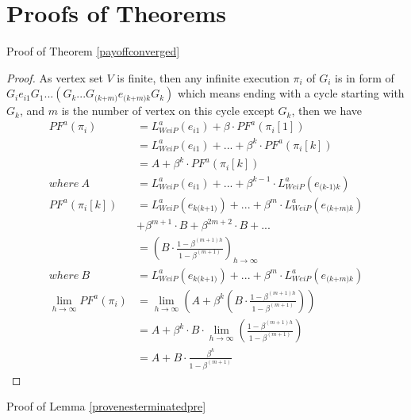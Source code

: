 \documentclass{acm_proc_article-sp}
\begin{document}



\newpage
\appendix

\section{Proofs of Theorems}
Proof of Theorem \ref{payoffconverged}
\begin{proof}
As vertex set $V$ is finite, then any infinite execution $\pi_{\textit{i}}$ of $G_{\textit{i}}$ is in form of $ G_{\textit{i}}e_{\textit{i1}}G_{\textit{1}}...(G_{\textit{k}}...G_ {\textit{(k+m)}}e_{\textit{(k+m)k}}G_{\textit{k}})$ which means ending with a cycle starting with $G_{\textit{k}}$, and $m$ is the number of vertex on this cycle except $G_{\textit{k}}$, then we have
\begin{align*}
PF^a(\pi_{\textit{i}})&=L^a_{\textit{WeiP}}(e_{\textit{i1}})+\beta\cdot PF^a(\pi_{\textit{i}}[1])\\
&=L^a_{\textit{WeiP}}(e_{\textit{i1}})+...+\beta^{k}\cdot PF^a(\pi_{\textit{i}}[k])\\
&=A+\beta^{k}\cdot PF^a(\pi_{\textit{i}}[k])\\
where~A&=L^a_{\textit{WeiP}}(e_{\textit{i1}})+...+\beta^{k-1}\cdot L^a_{\textit{WeiP}}(e_{\textit{(k-1)k}}) \\
PF^a(\pi_{\textit{i}}[k]) & =L^a_{\textit{WeiP}}(e_{\textit{k(k+1)}})+...+\beta^{m}\cdot L^a_{\textit{WeiP}}(e_{\textit{(k+m)k}})\\
&+\beta^{m+1}\cdot B+\beta^{2m+2}\cdot B+...\\
& =(B\cdot \frac{1-\beta^{(m+1)h}}{1-\beta^{(m+1)}})_{h\rightarrow \infty}\\
where~B&=L^a_{\textit{WeiP}}(e_{\textit{k(k+1)}})+...+\beta^{m}\cdot L^a_{\textit{WeiP}}(e_{\textit{(k+m)k}})\\
\underset{h\rightarrow \infty}{\lim}PF^a(\pi_{\textit{i}})&= \underset{h\rightarrow \infty}{\lim}(A+\beta^{k}(B\cdot \frac{1-\beta^{(m+1)h}}{1-\beta^{(m+1)}}))\\
&=A+\beta^{k}\cdot B\cdot \underset{h\rightarrow \infty}{\lim}(\frac{1-\beta^{(m+1)h}}{1-\beta^{(m+1)}})\\
&=A+B\cdot \frac{\beta^{k}}{1-\beta^{(m+1)}}
\end{align*}
\end{proof}
Proof of Lemma \ref{provenesterminatedpre}
\end{document}
